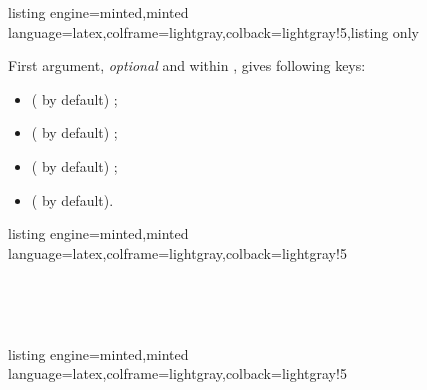 \documentclass[11pt,a4paper]{ltxdoc}
\begin{document}
\begin{tcblisting}{listing engine=minted,minted language=latex,colframe=lightgray,colback=lightgray!5,listing only}
\end{tcblisting}

First argument, \textit{optional} and within \MontreCode{[...]}, gives following keys:

\begin{itemize}
	\item {} ( by default) ;
	\item {} ( by default) ;
	\item {} ( by default) ;
	\item {} ( by default).
\end{itemize}

\begin{tcblisting}{listing engine=minted,minted language=latex,colframe=lightgray,colback=lightgray!5}
\begin{GraphTikz}[x=0.4cm,y=0.4cm,Xmin=-5,Xmax=5,Ymin=-5,Ymax=5]
\end{GraphTikz}
~~
\begin{GraphTikz}[x=0.4cm,y=0.4cm,Xmin=-5,Xmax=5,Ymin=-5,Ymax=5]
\end{GraphTikz}
~~
\begin{GraphTikz}[x=0.4cm,y=0.4cm,Xmin=-5,Xmax=5,Ymin=-5,Ymax=5]
\end{GraphTikz}
\end{tcblisting}

\begin{tcblisting}{listing engine=minted,minted language=latex,colframe=lightgray,colback=lightgray!5}
\begin{GraphTikz}[x=0.4cm,y=0.4cm,Xmin=-5,Xmax=5,Ymin=-5,Ymax=5]
\end{GraphTikz}
~~
\begin{GraphTikz}[x=0.4cm,y=0.4cm,Xmin=-5,Xmax=5,Ymin=-5,Ymax=5]
\end{GraphTikz}
~~
\begin{GraphTikz}[x=0.4cm,y=0.4cm,Xmin=-5,Xmax=5,Ymin=-5,Ymax=5]
\end{GraphTikz}
\end{tcblisting}
\end{document}
